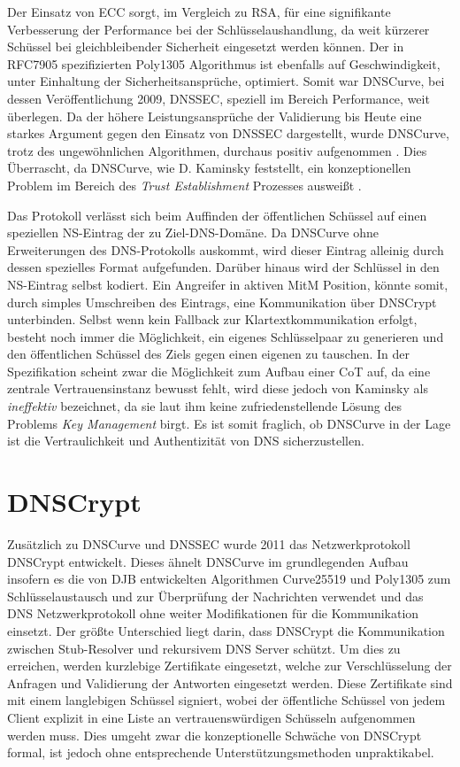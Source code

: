 Der Einsatz von ECC sorgt, im Vergleich zu RSA, für eine signifikante Verbesserung der Performance bei der Schlüsselaushandlung, da weit kürzerer Schüssel bei gleichbleibender Sicherheit eingesetzt werden können\cite{Gupta2002}. Der in RFC7905 spezifizierten Poly1305 Algorithmus ist ebenfalls auf Geschwindigkeit, unter Einhaltung der Sicherheitsansprüche, optimiert\cite{Bernstein2005}. Somit war DNSCurve, bei dessen Veröffentlichung 2009, DNSSEC, speziell im Bereich Performance, weit überlegen. Da der höhere Leistungsansprüche der Validierung bis Heute eine starkes Argument gegen den Einsatz von DNSSEC dargestellt, wurde DNSCurve, trotz des ungewöhnlichen Algorithmen, durchaus positiv aufgenommen \cite{Henry2013}. Dies Überrascht, da DNSCurve, wie D. Kaminsky feststellt, ein konzeptionellen Problem im Bereich des \textit{Trust Establishment} Prozesses ausweißt \cite{Kaminsky2011}. 

Das Protokoll verlässt sich beim Auffinden der öffentlichen Schüssel auf einen speziellen NS-Eintrag der zu Ziel-DNS-Domäne. Da DNSCurve ohne Erweiterungen des DNS-Protokolls auskommt, wird dieser Eintrag alleinig durch dessen spezielles Format aufgefunden. Darüber hinaus wird der Schlüssel in den NS-Eintrag selbst kodiert. Ein Angreifer in aktiven MitM Position, könnte somit, durch simples Umschreiben des Eintrags, eine Kommunikation über DNSCrypt unterbinden. Selbst wenn kein Fallback zur Klartextkommunikation erfolgt, besteht noch immer die Möglichkeit, ein eigenes Schlüsselpaar zu generieren und den öffentlichen Schüssel des Ziels gegen einen eigenen zu tauschen. In der Spezifikation scheint zwar die Möglichkeit zum Aufbau einer CoT auf, da eine zentrale Vertrauensinstanz bewusst fehlt, wird diese jedoch von Kaminsky als \textit{ineffektiv} bezeichnet, da sie laut ihm keine zufriedenstellende Lösung des Problems \textit{Key Management} birgt. Es ist somit fraglich, ob DNSCurve in der Lage ist die Vertraulichkeit und Authentizität von DNS sicherzustellen.  

\section{DNSCrypt}
Zusätzlich zu DNSCurve und DNSSEC wurde 2011 das Netzwerkprotokoll DNSCrypt entwickelt. Dieses ähnelt DNSCurve im grundlegenden Aufbau insofern es die von DJB entwickelten Algorithmen Curve25519 und Poly1305 zum Schlüsselaustausch und zur Überprüfung der Nachrichten verwendet und das DNS Netzwerkprotokoll ohne weiter Modifikationen für die Kommunikation einsetzt. Der größte Unterschied liegt darin, dass DNSCrypt die Kommunikation zwischen Stub-Resolver und rekursivem DNS Server schützt. Um dies zu erreichen, werden kurzlebige Zertifikate eingesetzt, welche zur Verschlüsselung der Anfragen und Validierung der Antworten eingesetzt werden. Diese Zertifikate sind mit einem langlebigen Schüssel signiert, wobei der öffentliche Schüssel von jedem Client explizit in eine Liste an vertrauenswürdigen Schüsseln aufgenommen werden muss.\cite{Denis2016} Dies umgeht zwar die konzeptionelle Schwäche von DNSCrypt formal, ist jedoch ohne entsprechende Unterstützungsmethoden unpraktikabel. 

